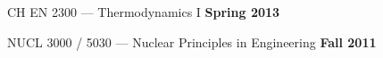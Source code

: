 % 
\begin{list2}
\item CH EN 2300 ---  Thermodynamics I \hfill {\bf Spring 2013}
\item NUCL 3000 / 5030 ---  Nuclear Principles in Engineering \hfill {\bf Fall 2011}






% 
\end{list2}


% 
% 


